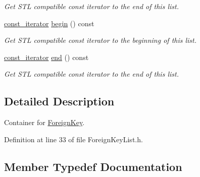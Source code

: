 \begin{DoxyCompactItemize}
\begin{DoxyCompactList}\small\item\em Get S\+TL compatible const iterator to the end of this list. \end{DoxyCompactList}\item 
\hyperlink{class_mdt_1_1_item_model_1_1_foreign_key_list_a3c761b1204692763e403333043701b6a}{const\+\_\+iterator} \hyperlink{class_mdt_1_1_item_model_1_1_foreign_key_list_a8391ea0f436ee61a2473b9e2c2de848b}{begin} () const \hypertarget{class_mdt_1_1_item_model_1_1_foreign_key_list_a8391ea0f436ee61a2473b9e2c2de848b}{}\label{class_mdt_1_1_item_model_1_1_foreign_key_list_a8391ea0f436ee61a2473b9e2c2de848b}

\begin{DoxyCompactList}\small\item\em Get S\+TL compatible const iterator to the beginning of this list. \end{DoxyCompactList}\item 
\hyperlink{class_mdt_1_1_item_model_1_1_foreign_key_list_a3c761b1204692763e403333043701b6a}{const\+\_\+iterator} \hyperlink{class_mdt_1_1_item_model_1_1_foreign_key_list_ae2da652d1b9a344543e556eda5a73b28}{end} () const \hypertarget{class_mdt_1_1_item_model_1_1_foreign_key_list_ae2da652d1b9a344543e556eda5a73b28}{}\label{class_mdt_1_1_item_model_1_1_foreign_key_list_ae2da652d1b9a344543e556eda5a73b28}

\begin{DoxyCompactList}\small\item\em Get S\+TL compatible const iterator to the end of this list. \end{DoxyCompactList}\end{DoxyCompactItemize}


\subsection{Detailed Description}
Container for \hyperlink{class_mdt_1_1_item_model_1_1_foreign_key}{Foreign\+Key}. 

Definition at line 33 of file Foreign\+Key\+List.\+h.



\subsection{Member Typedef Documentation}
